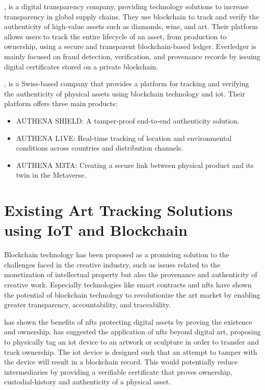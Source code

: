 \textcite{everledger}, is a digital transparency company, providing technology solutions to increase transparency in global supply chains. They use blockchain to track and verify the authenticity of high-value assets such as diamonds, wine, and art. Their platform allows users to track the entire lifecycle of an asset, from production to ownership, using a secure and transparent blockchain-based ledger. Everledger is mainly focused on fraud detection, verification, and provenance records by issuing digital certificates stored on a private blockchain.

\textcite{authena}, is a Swiss-based company that provides a platform for tracking and verifying the authenticity of physical assets using blockchain technology and \gls{iot}. Their platform offers three main products:
\begin{itemize}
    \item AUTHENA SHIELD: A tamper-proof end-to-end authenticity solution.
    \item AUTHENA L1VE: Real-time tracking of location and environmental conditions across countries and distribution channels.
    \item AUTHENA M3TA: Creating a secure link between physical product and its twin in the Metaverse.
\end{itemize}

\section{Existing Art Tracking Solutions using IoT and Blockchain}
Blockchain technology has been proposed as a promising solution to the challenges faced in the creative industry, such as issues related to the monetization of intellectual property but also the provenance and authenticity of creative work. \cite{creativeindustry} Especially technologies like smart contracts and \glspl{nft} have shown the potential of blockchain technology to revolutionize the art market by enabling greater transparency, accountability, and traceability.  

\textcite{nftopportunities} has shown the benefits of \glspl{nft} protecting digital assets by proving the existence and ownership. \textcite{creativeindustry} has suggested the application of \glspl{nft} beyond digital art, proposing to physically tag an \gls{iot} device to an artwork or sculpture in order to transfer and track ownership. The \gls{iot} device is designed such that an attempt to tamper with the device will result in a blockchain record. This would potentially reduce intermediaries by providing a verifiable certificate that proves ownership, custodial-history and authenticity of a physical asset.

